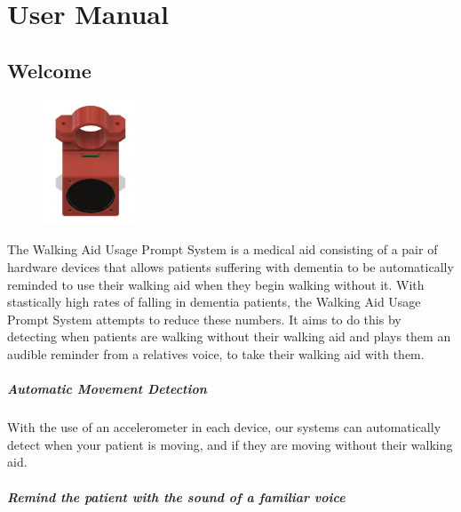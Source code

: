 \chapter{User Manual}
\label{ch:usermanual}


	\section{Welcome}
	\label{sec:welcome}

		\begin{figure}
			\vspace{-5em}
			\centering
			\includegraphics[width=0.25\textwidth]{graphics/final-cad.png}
		\end{figure}

		The Walking Aid Usage Prompt System is a medical aid consisting of a pair of hardware devices that allows patients suffering with dementia to be automatically reminded to use their walking aid when they begin walking without it. With stastically high rates of falling in dementia patients, the Walking Aid Usage Prompt System attempts to reduce these numbers. It aims to do this by detecting when patients are walking without their walking aid and plays them an audible reminder from a relatives voice, to take their walking aid with them.

		\paragraph{Automatic Movement Detection}\mbox{}

		With the use of an accelerometer in each device, our systems can automatically detect when your patient is moving, and if they are moving without their walking aid.

		\paragraph{Remind the patient with the sound of a familiar voice}\mbox{}

